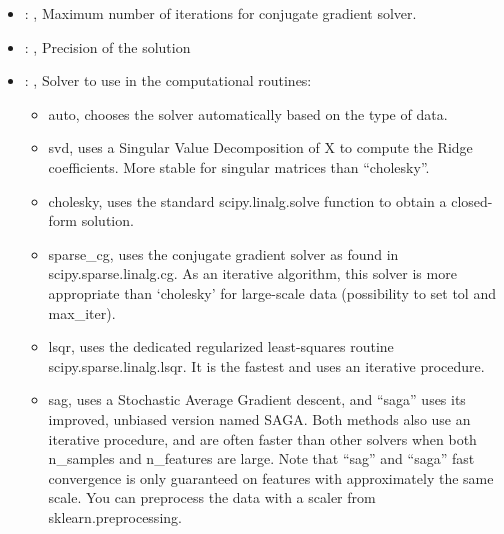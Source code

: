 \begin{itemize}
    \item {}: , 
      Maximum number of iterations for conjugate gradient solver.

    \item {}: , 
      Precision of the solution

    \item {}: , 
      Solver to use in the computational routines:
      \begin{itemize}                                                    \item auto, chooses the
      solver automatically based on the type of data.
      \item svd, uses a Singular Value Decomposition of X to compute the Ridge coefficients. More
      stable for singular                                                                matrices
      than ``cholesky''.                                                    \item cholesky, uses the
      standard scipy.linalg.solve function to obtain a closed-form solution.
      \item sparse\_cg, uses the conjugate gradient solver as found in scipy.sparse.linalg.cg. As an
      iterative algorithm,                                                               this solver
      is more appropriate than ‘cholesky’ for large-scale data (possibility to set tol and
      max\_iter).                                                    \item lsqr, uses the dedicated
      regularized least-squares routine scipy.sparse.linalg.lsqr. It is the fastest and uses
      an iterative procedure.                                                    \item sag, uses a
      Stochastic Average Gradient descent, and ``saga'' uses its improved, unbiased version named
      SAGA.                                                               Both methods also use an
      iterative procedure, and are often faster than other solvers when both
      n\_samples and n\_features are large. Note that ``sag'' and ``saga'' fast convergence is only
      guaranteed on                                                               features with
      approximately the same scale. You can preprocess the data with a scaler from
      sklearn.preprocessing.                                                  \end{itemize}
  \end{itemize}


